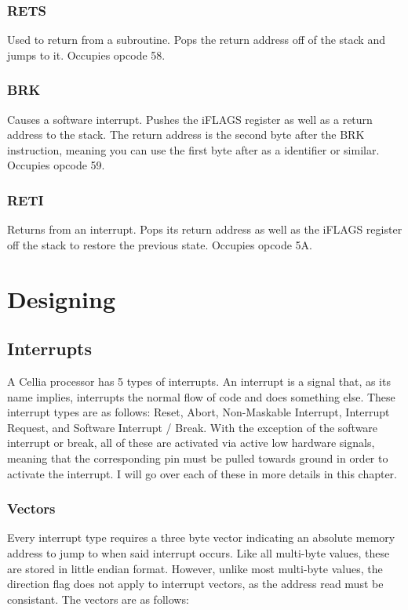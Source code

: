 \documentclass[letterpaper,12pt]{book}
\begin{document}
\section{RETS}

Used to return from a subroutine. Pops the return address off of the stack and jumps to it. Occupies opcode 58.

\section{BRK}

Causes a software interrupt. Pushes the iFLAGS register as well as a return address to the stack. The return address is the second byte after the BRK instruction, meaning you can use the first byte after as a identifier or similar. Occupies opcode 59.

\section{RETI}

Returns from an interrupt. Pops its return address as well as the iFLAGS register off the stack to restore the previous state. Occupies opcode 5A.

\part{Designing}

\chapter{Interrupts}

A Cellia processor has 5 types of interrupts. An interrupt is a signal that, as its name implies, interrupts the normal flow of code and does something else. These interrupt types are as follows: Reset, Abort, Non-Maskable Interrupt, Interrupt Request, and Software Interrupt / Break. With the exception of the software interrupt or break, all of these are activated via active low hardware signals, meaning that the corresponding pin must be pulled towards ground in order to activate the interrupt. I will go over each of these in more details in this chapter.

\section{Vectors}

Every interrupt type requires a three byte vector indicating an absolute memory address to jump to when said interrupt occurs. Like all multi-byte values, these are stored in little endian format. However, unlike most multi-byte values, the direction flag does not apply to interrupt vectors, as the address read must be consistant. The vectors are as follows:
\end{document}
